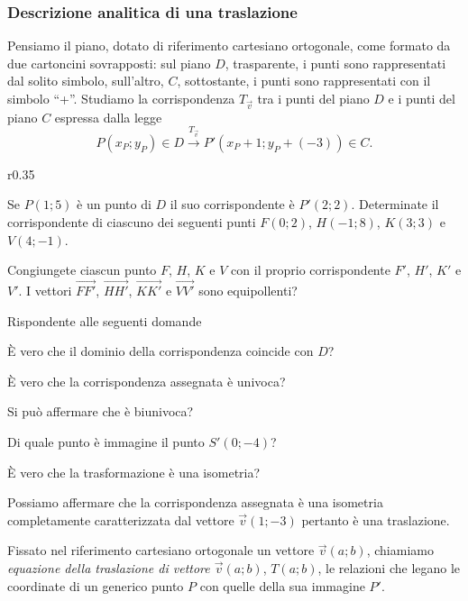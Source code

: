 \subsubsection{Descrizione analitica di una traslazione}

Pensiamo il piano, dotato di riferimento cartesiano ortogonale, come 
formato da due cartoncini sovrapposti: sul piano \(D\), trasparente, i 
punti sono rappresentati dal solito simbolo, sull'altro, \(C\), 
sottostante, i punti sono rappresentati con il simbolo ``+''.
Studiamo la corrispondenza \(T_{\vec{v}}\) tra i punti del piano \(D\) e 
i punti del piano \(C\) espressa dalla legge
\[P(x_P;y_P)\in D \overset{T_{\vec{v}}}\rightarrow 
P'(x_P+1;y_P+(-3))\in C.\]

\setlength{\intextsep}{3pt plus 2.0pt minus 2.0pt}
\begin{wrapfigure}{r}{0.35\textwidth}
  \centering
\end{wrapfigure}

Se \(P(1;5)\) è un punto di \(D\) il suo corrispondente è \(P'(2;2)\). 
Determinate il corrispondente di ciascuno dei seguenti punti 
\(F(0;2)\), \(H(-1;8)\), \(K(3;3)\) e \(V(4;-1)\).

Congiungete ciascun punto \(F\), \(H\), \(K\) e \(V\) con il proprio 
corrispondente \(F'\), \(H'\), \(K'\) e \(V'\). I vettori 
\(\overrightarrow{FF'}\), \(\overrightarrow{HH'}\), 
\(\overrightarrow{KK'}\) e \(\overrightarrow{VV'}\) sono equipollenti?

Rispondente alle seguenti domande
\begin{itemize*}
  \item \`E vero che il dominio della corrispondenza coincide con \(D\)?
  \item \`E vero che la corrispondenza assegnata è univoca?
  \item Si può affermare che è biunivoca?
  \item Di quale punto è immagine il punto \(S'(0;-4)\)?
  \item \`E vero che la trasformazione è una isometria?
\end{itemize*}

Possiamo affermare che la corrispondenza assegnata è una isometria 
completamente caratterizzata dal vettore \(\vec{v}(1;-3)\) pertanto è 
una traslazione.

\begin{definizione}
  Fissato nel riferimento cartesiano ortogonale un vettore 
  \(\vec{v}(a;b)\), chiamiamo \emph{equazione della traslazione di 
    vettore \(\vec{v}(a;b)\)}, \(T(a;b)\), le relazioni che legano le 
  coordinate di un generico punto \(P\) con quelle della sua immagine 
  \(P'\).
\end{definizione}

